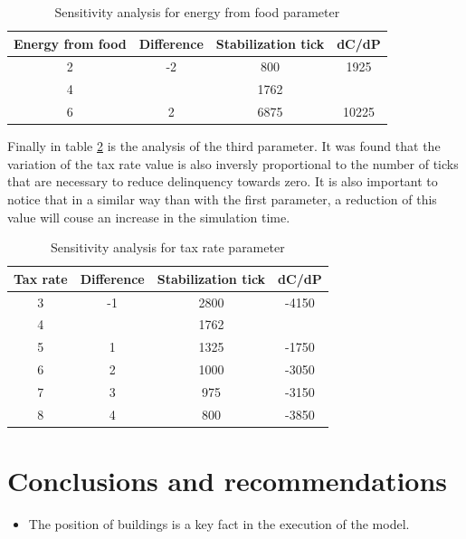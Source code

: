 \documentclass{wscpaperproc}
\begin{document}
\begin{table}[h!]
    \centering
    \begin{tabular}{|c|c|c|c|}
        \hline
        Energy from food & Difference & Stabilization tick &  dC/dP\\
        \hline
        2 & -2 & 800 & 1925\\
        \hline
        \rowcolor{lightgray}
        4 &      & 1762 & \\
        \hline
        6 & 2  & 6875 & 10225\\
        \hline
    \end{tabular}
    \caption{Sensitivity analysis for energy from food parameter}
    \label{table:energy}
\end{table}

Finally in table \ref{table:taxes} is the analysis of the third parameter. It
was found that the variation of the tax rate value is also inversly
proportional to the number of ticks that are necessary to reduce delinquency
towards zero. It is also important to notice that in a similar way than with
the first parameter, a reduction of this value will couse an increase in the
simulation time.\\

\begin{table}[h!]
    \centering
    \begin{tabular}{|c|c|c|c|}
        \hline
        Tax rate & Difference & Stabilization tick &  dC/dP\\
        \hline
        3 & -1 & 2800 & -4150\\
        \hline
        \rowcolor{lightgray}
        4 &    & 1762 & \\
        \hline
        5 & 1  & 1325 & -1750\\
        \hline
        6 & 2  & 1000 & -3050\\
        \hline
        7 & 3  & 975  & -3150\\
        \hline
        8 & 4  & 800  & -3850\\
        \hline
    \end{tabular}
    \caption{Sensitivity analysis for tax rate parameter}
    \label{table:taxes}
\end{table}

\section{Conclusions and recommendations}

\begin{itemize}
    \item The position of buildings is a key fact in the execution of the model.
\end{itemize}



\end{document}
